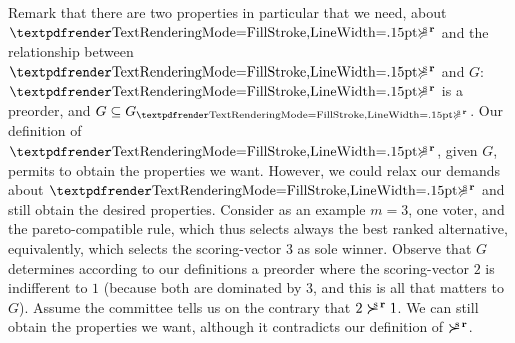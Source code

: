\documentclass[version=last, pagesize, twoside=off, bibliography=totoc, DIV=calc, fontsize=14pt, a4paper, french, english]{scrartcl}
\begin{document}

Remark that there are two properties in particular that we need, about $\prefsv$ and the relationship between $\prefsv$ and $G$: $\prefsv$ is a preorder, and $G \subseteq G_{\prefsv}$. Our definition of $\prefsv$, given $G$, permits to obtain the properties we want. However, we could relax our demands about $\prefsv$ and still obtain the desired properties. Consider as an example $m = 3$, one voter, and the pareto-compatible rule, which thus selects always the best ranked alternative, equivalently, which selects the scoring-vector $3$ as sole winner. Observe that $G$ determines according to our definitions a preorder where the scoring-vector $2$ is indifferent to $1$ (because both are dominated by $3$, and this is all that matters to $G$). Assume the committee tells us on the contrary that $2 \mathrel{\boldsymbol{\succ}^{\text{\!\!\!s}\textbf{\,r}}} 1$. We can still obtain the properties we want, although it contradicts our definition of $\mathrel{\boldsymbol{\succ}^{\text{\!\!\!s}\textbf{\,r}}}$.
\end{document}
